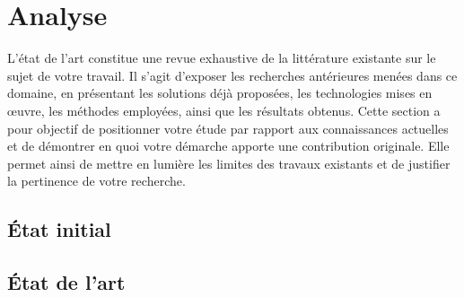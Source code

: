\chapter{Analyse}

L'état de l'art constitue une revue exhaustive de la littérature existante sur le sujet de votre travail. Il s'agit d'exposer les recherches antérieures menées dans ce domaine, en présentant les solutions déjà proposées, les technologies mises en œuvre, les méthodes employées, ainsi que les résultats obtenus. Cette section a pour objectif de positionner votre étude par rapport aux connaissances actuelles et de démontrer en quoi votre démarche apporte une contribution originale. Elle permet ainsi de mettre en lumière les limites des travaux existants et de justifier la pertinence de votre recherche.

\section{État initial}



\section{État de l'art}

